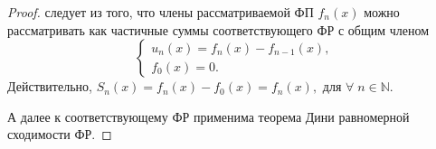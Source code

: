 \begin{proof}
	следует из того, что члены рассматриваемой ФП $f_n(x)$ можно рассматривать как частичные суммы соответствующего ФР с общим членом
	\begin{equation}
	\label{eq:1_27}
	\begin{cases}
	u_n(x) = f_n(x) - f_{n-1}(x),\\
	f_0(x) = 0.
	\end{cases}
	\end{equation}
	Действительно, $S_n(x) = f_n(x) - f_0(x) = f_n(x), \text{ для } \forall \; n \in \mathbb{N}$.

	А далее к соответствующему ФР применима теорема Дини равномерной сходимости ФР.
\end{proof}
